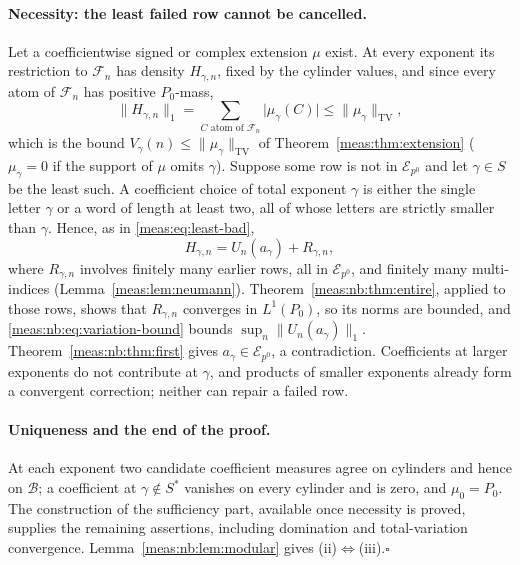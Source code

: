 \documentclass[11pt]{article}
\numberwithin{equation}{section}
\theoremstyle{definition}
\theoremstyle{remark}
\newcommand{\B}{\mathcal B}
\newcommand{\TV}{\mathrm{TV}}
\newcommand{\norm}[1]{\lVert#1\rVert}
\newcommand{\abs}[1]{\lvert#1\rvert}
\newcommand{\Erow}{\mathcal E_{p^0}}
\begin{document}
\paragraph{Necessity: the least failed row cannot be cancelled.} Let a
coefficientwise signed or complex extension $\mu$ exist. At every exponent its
restriction to $\mathcal F_n$ has density $H_{\gamma,n}$, fixed by the cylinder values,
and since every atom of $\mathcal F_n$ has positive $P_0$-mass,
\begin{equation}\label{meas:nb:eq:variation-bound}
 \norm{H_{\gamma,n}}_1=\sum_{C\text{ atom of }\mathcal F_n}\abs{\mu_\gamma(C)}\le\norm{\mu_\gamma}_\TV ,
\end{equation}
which is the bound $V_\gamma(n)\le\norm{\mu_\gamma}_\TV$ of
Theorem~\ref{meas:thm:extension} ($\mu_\gamma=0$ if the support of $\mu$ omits
$\gamma$). Suppose some row is not in $\Erow$ and let $\gamma\in S$ be the least such.
A coefficient choice of total exponent $\gamma$ is either the single letter $\gamma$ or
a word of length at least two, all of whose letters are strictly smaller than
$\gamma$. Hence, as in \eqref{meas:eq:least-bad},
\begin{equation}\label{meas:nb:eq:least-bad}
 H_{\gamma,n}=U_n(a_\gamma)+R_{\gamma,n},
\end{equation}
where $R_{\gamma,n}$ involves finitely many earlier rows, all in $\Erow$, and finitely
many multi-indices (Lemma~\ref{meas:lem:neumann}). Theorem~\ref{meas:nb:thm:entire},
applied to those rows, shows that $R_{\gamma,n}$ converges in $L^1(P_0)$, so its norms
are bounded, and \eqref{meas:nb:eq:variation-bound} bounds
$\sup_n\norm{U_n(a_\gamma)}_1$. Theorem~\ref{meas:nb:thm:first} gives $a_\gamma\in\Erow$,
a contradiction. Coefficients at larger exponents do not contribute at $\gamma$, and
products of smaller exponents already form a convergent correction; neither can
repair a failed row.

\paragraph{Uniqueness and the end of the proof.} At each exponent two candidate
coefficient measures agree on cylinders and hence on $\B$; a coefficient at
$\gamma\notin S^*$ vanishes on every cylinder and is zero, and $\mu_0=P_0$. The
construction of the sufficiency part, available once necessity is proved, supplies
the remaining assertions, including domination and total-variation convergence.
Lemma~\ref{meas:nb:lem:modular} gives (ii)$\Leftrightarrow$(iii).\hfill$\square$
\end{document}
